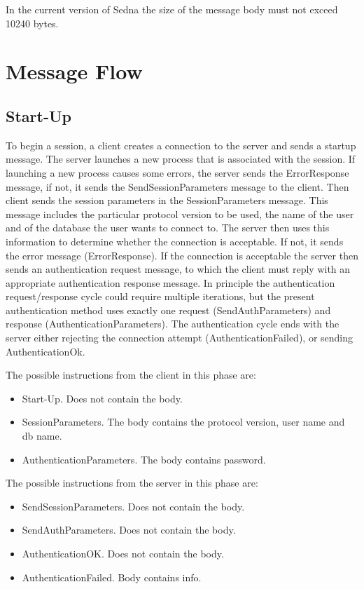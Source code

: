 \documentclass[a4paper,12pt]{article}
\begin{document}
In the current version of Sedna the size of the message body must not exceed 10240 bytes.
\section{Message Flow}

\subsection{Start-Up}

To begin a session, a client creates a connection to the server and sends a startup message. The server launches a new process that is associated with the session. If launching a new process causes some errors, the server sends the ErrorResponse message, if not, it sends the SendSessionParameters message to the client. Then client sends the session parameters in the SessionParameters message. This message includes the particular protocol version to be used, the name of the user and of the database the user wants to connect to. The server then uses this information to determine whether the connection is acceptable. If not, it sends the error message (ErrorResponse). If the connection is acceptable the server then sends an authentication request message, to which the client must reply with an appropriate authentication response message. In principle the authentication request/response cycle could require multiple iterations, but the present authentication method uses exactly one request (SendAuthParameters) and response (AuthenticationParameters). The authentication cycle ends with the server either rejecting the connection attempt (AuthenticationFailed), or sending AuthenticationOk. 

The possible instructions from the client in this phase are:
\begin{itemize} 
\item Start-Up. Does not contain the body.
\item SessionParameters. The body contains the protocol version, user name and db name.
\item AuthenticationParameters. The body contains password.
\end{itemize} 

The possible instructions from the server in this phase are:
\begin{itemize} 
\item SendSessionParameters. Does not contain the body.
\item SendAuthParameters. Does not contain the body.
\item AuthenticationOK. Does not contain the body.
\item AuthenticationFailed. Body contains info.
\end{itemize}
\end{document}
